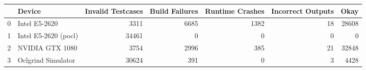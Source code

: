 \begin{tabular}{llrrrrr}
\toprule
{} &                Device &  Invalid Testcases &  Build Failures &  Runtime Crashes &  Incorrect Outputs &   Okay \\
\midrule
0 &         Intel E5-2620 &               3311 &            6685 &             1382 &                 18 &  28608 \\
1 &  Intel E5-2620 (pocl) &              34461 &               0 &                0 &                  0 &      0 \\
2 &       NVIDIA GTX 1080 &               3754 &            2996 &              385 &                 21 &  32848 \\
3 &    Oclgrind Simulator &              30624 &             391 &                0 &                  3 &   4428 \\
\bottomrule
\end{tabular}
